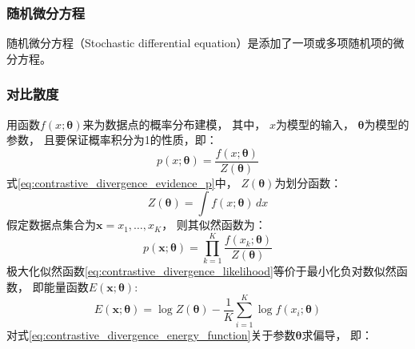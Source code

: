 \subsubsection{随机微分方程}
随机微分方程（Stochastic differential equation）是添加了一项或多项随机项的微分方程。



\subsubsection{对比散度}

用函数{$f(x;\bm{\theta})$}来为数据点的概率分布建模，
其中，
{$x$}为模型的输入，
{$\bm{\theta}$}为模型的参数，
且要保证概率积分为1的性质，即：
\begin{equation}
    \label{eq:contrastive_divergence_evidence_p}
    p(x;\bm{\theta})=\frac{f(x;\bm{\theta})}{Z(\bm{\theta})}
\end{equation}
式{\ref{eq:contrastive_divergence_evidence_p}}中，
{$Z(\bm{\theta})$}为划分函数：
\begin{equation}
    \label{eq:contrastive_divergence_evidence_z}
    Z(\bm{\theta})=\int f(x;\bm{\theta}) \,dx
\end{equation}
假定数据点集合为{$\bm{x}=x_1, \ldots, x_K$}，
则其似然函数为：
\begin{equation}
    \label{eq:contrastive_divergence_likelihood}
    p(\bm{x};\bm{\theta})=\prod_{k=1}^{K} \frac{f(x_k;\bm{\theta})}{Z(\bm{\theta})}
\end{equation}
极大化似然函数{\ref{eq:contrastive_divergence_likelihood}}等价于最小化负对数似然函数，
即能量函数{$E(\bm{x};\bm{\theta})$}:
\begin{equation}
    \label{eq:contrastive_divergence_energy_function}
    E(\bm{x};\bm{\theta})
    = \log Z(\bm{\theta}) - \frac{1}{K} \sum_{i=1}^{K} \log f(x_i;\bm{\theta})
\end{equation}
对式{\ref{eq:contrastive_divergence_energy_function}}关于参数{$\bm{\theta}$}求偏导，
即：
